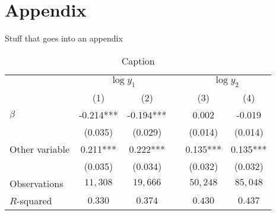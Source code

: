 \documentclass[12pt]{article}
\begin{document}
\lipsum[5-6]








\newpage\clearpage
\appendix 
\setcounter{figure}{0} \renewcommand{\thefigure}{A\arabic{figure}}
\setcounter{table}{0} \renewcommand{\thetable}{A\arabic{table}}

\section*{Appendix}
Stuff that goes into an appendix

\lipsum[7]

\begin{table}[h]
    \centering
    \begin{tabular}{lSScSS}
    &  && 
       \\
            & {(1)}     & {(2)}     && {(3)}     & {(4)}     \\ \midrule
    $\beta$
            & -0.214*** & -0.194*** &&  0.002    & -0.019    \\
            & (0.035)   & (0.029)   && (0.014)   & (0.014)   \\
    Other variable
            &  0.211*** &  0.222*** &&  0.135*** &  0.135*** \\
            & (0.035)   & (0.034)   && (0.032)   & (0.032)   \\ \midrule
    Observations 
            &  {$11{,}308$} & {$19{,}666$}  && {$50{,}248$}  & {$85{,}048$}  \\
    $R$-squared
            & {$0.330$}   & {$0.374$}   && {$0.430$}   & {$0.437$}   \\ \bottomrule
    \end{tabular}
    \caption{Caption}
    \label{tab:my_label}
\end{table}
\end{document}
